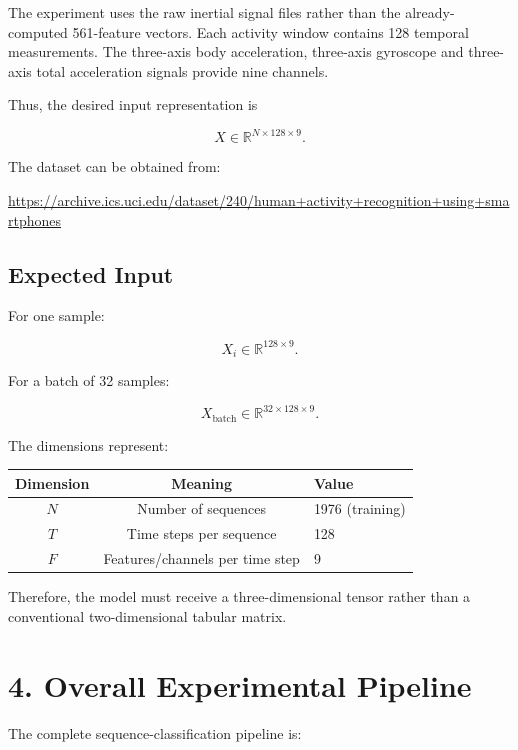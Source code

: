 \documentclass[10pt]{article}
\begin{document}
The experiment uses the raw inertial signal files rather than the
already-computed 561-feature vectors. Each activity window contains 128
temporal measurements. The three-axis body acceleration, three-axis
gyroscope and three-axis total acceleration signals provide nine channels.

Thus, the desired input representation is

\[
X\in\mathbb{R}^{N\times128\times9}.
\]

The dataset can be obtained from:

\url{https://archive.ics.uci.edu/dataset/240/human+activity+recognition+using+smartphones}

\subsection*{Expected Input}

For one sample:

\[
X_i\in\mathbb{R}^{128\times9}.
\]

For a batch of 32 samples:

\[
X_{\mathrm{batch}}\in\mathbb{R}^{32\times128\times9}.
\]

The dimensions represent:

\begin{center}
\begin{tabular}{|c|c|l|}
\hline
Dimension & Meaning & Value\\
\hline
$N$ & Number of sequences & 1976 (training)\\
$T$ & Time steps per sequence & 128\\
$F$ & Features/channels per time step & 9\\
\hline
\end{tabular}
\end{center}

Therefore, the model must receive a three-dimensional tensor rather than a
conventional two-dimensional tabular matrix.

\section*{4. Overall Experimental Pipeline}

The complete sequence-classification pipeline is:

\begin{center}
\end{center}
\end{document}
